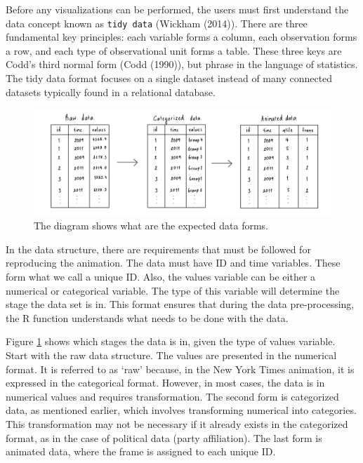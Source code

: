 Before any visualizations can be performed, the users must first understand the data concept known as \texttt{tidy\ data} (Wickham (2014)). There are three fundamental key principles: each variable forms a column, each observation forms a row, and each type of observational unit forms a table. These three keys are Codd's third normal form (Codd (1990)), but phrase in the language of statistics. The tidy data format focuses on a single dataset instead of many connected datasets typically found in a relational database.

\begin{figure}

{\centering \includegraphics[width=1\linewidth]{figures/data-diagram} 

}

\caption{The diagram shows what are the expected data forms.}\label{fig:data-diagram}
\end{figure}

In the data structure, there are requirements that must be followed for reproducing the animation. The data must have ID and time variables. These form what we call a unique ID. Also, the values variable can be either a numerical or categorical variable. The type of this variable will determine the stage the data set is in. This format ensures that during the data pre-processing, the R function understands what needs to be done with the data.

Figure \ref{fig:data-diagram} shows which stages the data is in, given the type of values variable. Start with the raw data structure. The values are presented in the numerical format. It is referred to as `raw' because, in the New York Times animation, it is expressed in the categorical format. However, in most cases, the data is in numerical values and requires transformation. The second form is categorized data, as mentioned earlier, which involves transforming numerical into categories.
This transformation may not be necessary if it already exists in the categorized format, as in the case of political data (party affiliation). The last form is animated data, where the frame is assigned to each unique ID.


